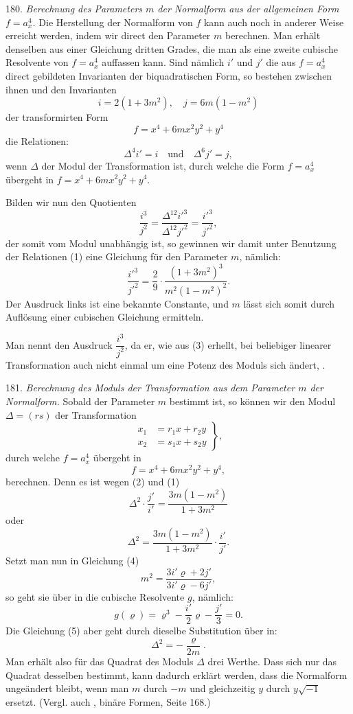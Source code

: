 \documentclass[11pt]{article}
\providecommand{\gesperrt}[1]{\textls[130]{#1}}
\providecommand{\weberpage}[1]{}
\providecommand{\weq}[2]{\begin{equation}\tag{#1}#2\end{equation}}
\let\Delta\varDelta
\begin{document}
180. \textit{Berechnung des Parameters $m$ der Normalform aus der allgemeinen Form $f=a_x^4$.} Die Herstellung der Normalform von $f$ kann auch noch in anderer Weise erreicht werden, indem wir direct den Parameter $m$ berechnen. Man erhält denselben aus einer Gleichung dritten Grades, die man als eine zweite cubische Resolvente von $f=a_x^4$ auffassen kann. Sind nämlich $i'$ und $j'$ die aus $f=a_x^4$ direct gebildeten Invarianten der biquadratischen Form, so bestehen zwischen ihnen und den Invarianten
\weq{1}{i=2(1+3m^2),\quad j=6m(1-m^2)}
der transformirten Form
\[
f=x^4+6mx^2y^2+y^4
\]
die Relationen:
\weq{2}{\Delta^4i'=i\quad\text{und}\quad\Delta^6j'=j,}
wenn $\Delta$ der Modul der Transformation ist, durch welche die Form $f=a_x^4$ übergeht in $f=x^4+6mx^2y^2+y^4$.


\weberpage{201}
Bilden wir nun den Quotienten
\weq{3}{\frac{i^3}{j^2}=\frac{\Delta^{12}i'^3}{\Delta^{12}j'^2}=\frac{i'^3}{j'^2},}
der somit vom Modul unabh\"angig ist, so gewinnen wir damit unter Benutzung der Relationen (1) eine Gleichung f\"ur den Parameter $m$, n\"amlich:
\weq{4}{\frac{i'^3}{j'^2}=\frac{2}{9}\cdot\frac{(1+3m^2)^3}{m^2(1-m^2)^2}.}
Der Ausdruck links ist eine bekannte Constante, und $m$ l\"asst sich somit durch Aufl\"osung einer cubischen Gleichung ermitteln.

Man nennt den Ausdruck $\dfrac{i^3}{j^2}$, da er, wie aus (3) erhellt, bei beliebiger linearer Transformation auch nicht einmal um eine Potenz des Moduls sich \"andert, \gesperrt{absolute Invariante}.

181. \textit{Berechnung des Moduls der Transformation aus dem Parameter $m$ der Normalform.} Sobald der Parameter $m$ bestimmt ist, so k\"onnen wir den Modul $\Delta=(rs)$ der Transformation
\[
\left.\begin{aligned}
x_1 &= r_1 x + r_2 y\\
x_2 &= s_1 x + s_2 y
\end{aligned}\right\},
\]
durch welche $f=a_x^4$ \"ubergeht in
\[
f = x^4 + 6mx^2y^2 + y^4,
\]
berechnen. Denn es ist wegen (2) und (1)
\[
\Delta^2\cdot\frac{j'}{i'} = \frac{3m(1-m^2)}{1+3m^2}
\]
oder
\weq{5}{\Delta^2 = \frac{3m(1-m^2)}{1+3m^2}\cdot\frac{i'}{j'}.}
Setzt man nun in Gleichung (4)
\[
m^2 = \frac{3i'\varrho+2j'}{3i'\varrho-6j'},
\]
so geht sie \"uber in die cubische Resolvente $g$, n\"amlich:
\[
g(\varrho) = \varrho^3 - \frac{i'}{2}\varrho - \frac{j'}{3} = 0.
\]
Die Gleichung (5) aber geht durch dieselbe Substitution \"uber in:
\[
\Delta^2 = -\frac{\varrho}{2m}.
\]
Man erh\"alt also f\"ur das Quadrat des Moduls $\Delta$ drei Werthe. Dass sich nur das Quadrat desselben bestimmt, kann dadurch erkl\"art werden, dass die Normalform unge\"andert bleibt, wenn man $m$ durch $-m$ und gleichzeitig $y$ durch $y\sqrt{-1}$ ersetzt. (Vergl. auch \gesperrt{Clebsch}, bin\"are Formen, Seite 168.)
\end{document}
